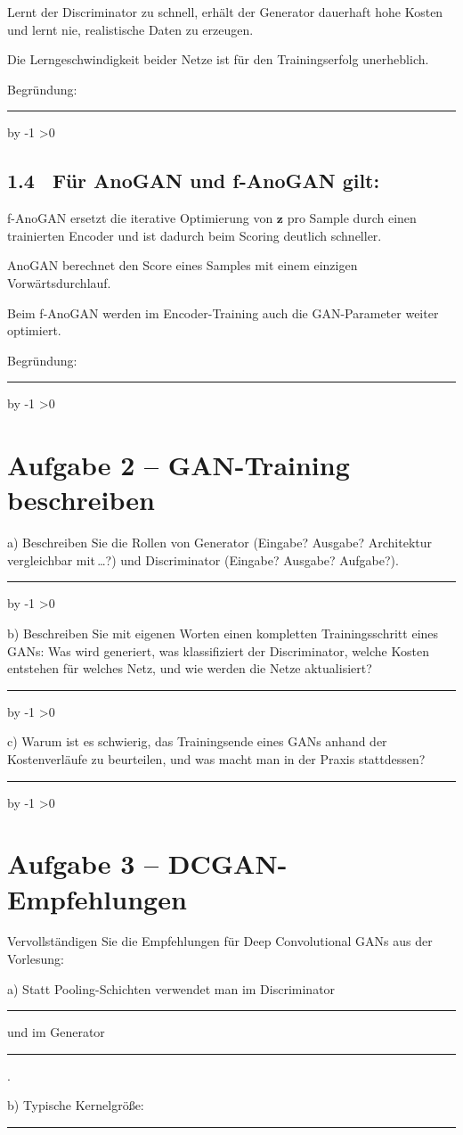 \documentclass[10pt,a4paper]{article}
\newcommand{\mcbox}{\raisebox{-1pt}{\fbox{\rule{0pt}{7pt}\rule{7pt}{0pt}}}\hspace{6pt}}
\newcommand{\antwortlinien}[1]{%
  \par\vspace{2pt}%
  \newcount\zeilen \zeilen=#1
  \loop
    \noindent\rule{\linewidth}{0.4pt}\par\vspace{11pt}%
    \advance\zeilen by -1
  \ifnum\zeilen>0 \repeat
}
\begin{document}
\mcbox Lernt der Discriminator zu schnell, erhält der Generator dauerhaft hohe Kosten und
lernt nie, realistische Daten zu erzeugen.

\mcbox Die Lerngeschwindigkeit beider Netze ist für den Trainingserfolg unerheblich.

Begründung:
\antwortlinien{2}

\subsection*{1.4 \ Für AnoGAN und f-AnoGAN gilt:}
\mcbox f-AnoGAN ersetzt die iterative Optimierung von $\boldsymbol{z}$ pro Sample durch einen
trainierten Encoder und ist dadurch beim Scoring deutlich schneller.

\mcbox AnoGAN berechnet den Score eines Samples mit einem einzigen Vorwärtsdurchlauf.

\mcbox Beim f-AnoGAN werden im Encoder-Training auch die GAN-Parameter weiter optimiert.

Begründung:
\antwortlinien{2}

\section*{Aufgabe 2 -- GAN-Training beschreiben}

a) Beschreiben Sie die Rollen von Generator (Eingabe? Ausgabe? Architektur vergleichbar
mit\,\dots?) und Discriminator (Eingabe? Ausgabe? Aufgabe?).
\antwortlinien{4}

b) Beschreiben Sie mit eigenen Worten einen kompletten Trainingsschritt eines GANs:
Was wird generiert, was klassifiziert der Discriminator, welche Kosten entstehen für
welches Netz, und wie werden die Netze aktualisiert?
\antwortlinien{6}

c) Warum ist es schwierig, das Trainingsende eines GANs anhand der Kostenverläufe
zu beurteilen, und was macht man in der Praxis stattdessen?
\antwortlinien{3}

\section*{Aufgabe 3 -- DCGAN-Empfehlungen}

Vervollständigen Sie die Empfehlungen für Deep Convolutional GANs aus der Vorlesung:

a) Statt Pooling-Schichten verwendet man im Discriminator \rule{5cm}{0.4pt}
und im Generator \rule{5cm}{0.4pt}.

b) Typische Kernelgröße: \rule{2.5cm}{0.4pt}
\end{document}
